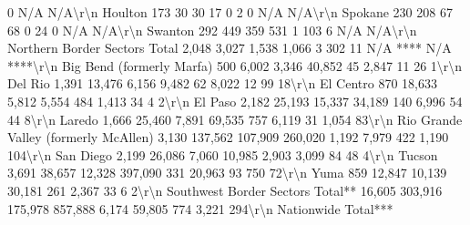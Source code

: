 \documentclass[
  12pt,
]{book}
\newenvironment{Shaded}{\begin{snugshade}}{\end{snugshade}}
\begin{document}
\begin{Shaded}
\begin{Highlighting}[]
        0           N/A     N/A\textbackslash{}r\textbackslash{}n Houlton                                           173                 30                       30                      17                0                2               0           N/A     N/A\textbackslash{}r\textbackslash{}n Spokane                                           230                208                       67                      68                0               24               0           N/A     N/A\textbackslash{}r\textbackslash{}n Swanton                                           292                449                      359                     531                1              103               6           N/A     N/A\textbackslash{}r\textbackslash{}n Northern Border Sectors Total                    2,048              3,027                    1,538                   1,066               3              302              11        N/A **** N/A ****\textbackslash{}r\textbackslash{}n Big Bend (formerly Marfa)                         500               6,002                   3,346                   40,852              45             2,847             11            26      1\textbackslash{}r\textbackslash{}n Del Rio                                          1,391             13,476                    6,156                   9,482              62             8,022             12            99     18\textbackslash{}r\textbackslash{}n El Centro                                         870              18,633                    5,812                   5,554             484             1,413             34             4      2\textbackslash{}r\textbackslash{}n El Paso                                          2,182             25,193                   15,337                  34,189             140             6,996             54            44      8\textbackslash{}r\textbackslash{}n Laredo                                           1,666             25,460                    7,891                  69,535             757             6,119             31          1,054    83\textbackslash{}r\textbackslash{}n Rio Grande Valley (formerly McAllen)             3,130            137,562                  107,909                260,020             1,192            7,979            422          1,190   104\textbackslash{}r\textbackslash{}n San Diego                                        2,199             26,086                    7,060                  10,985            2,903            3,099             84            48      4\textbackslash{}r\textbackslash{}n Tucson                                           3,691             38,657                   12,328                397,090              331            20,963             93           750     72\textbackslash{}r\textbackslash{}n Yuma                                              859              12,847                   10,139                  30,181             261             2,367             33             6      2\textbackslash{}r\textbackslash{}n Southwest Border Sectors Total**                16,605            303,916                  175,978                857,888             6,174           59,805            774          3,221   294\textbackslash{}r\textbackslash{}n Nationwide Total***                            
\end{Highlighting}
\end{Shaded}
\end{document}

